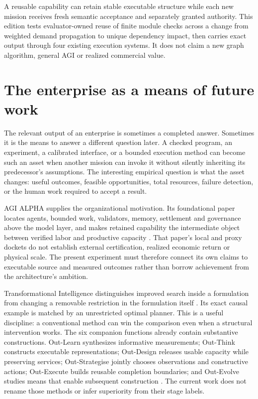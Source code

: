 \documentclass[11pt]{article}
\begin{document}

\begin{insightbox}[title={The central contribution}]
A reusable capability can retain stable executable structure while each new mission receives fresh semantic acceptance and separately granted authority. This edition tests evaluator-owned reuse of finite module checks across a change from weighted demand propagation to unique dependency impact, then carries exact output through four existing execution systems. It does not claim a new graph algorithm, general AGI or realized commercial value.
\end{insightbox}

\section{The enterprise as a means of future work}

The relevant output of an enterprise is sometimes a completed answer. Sometimes it is the means to answer a different question later. A checked program, an experiment, a calibrated interface, or a bounded execution method can become such an asset when another mission can invoke it without silently inheriting its predecessor's assumptions. The interesting empirical question is what the asset changes: useful outcomes, feasible opportunities, total resources, failure detection, or the human work required to accept a result.

AGI ALPHA supplies the organizational motivation. Its foundational paper locates agents, bounded work, validators, memory, settlement and governance above the model layer, and makes retained capability the intermediate object between verified labor and productive capacity \cite{agi_alpha}. That paper's local and proxy dockets do not establish external certification, realized economic return or physical scale. The present experiment must therefore connect its own claims to executable source and measured outcomes rather than borrow achievement from the architecture's ambition.

Transformational Intelligence distinguishes improved search inside a formulation from changing a removable restriction in the formulation itself \cite{ti}. Its exact causal example is matched by an unrestricted optimal planner. This is a useful discipline: a conventional method can win the comparison even when a structural intervention works. The six companion functions already contain substantive constructions. Out-Learn synthesizes informative measurements; Out-Think constructs executable representations; Out-Design releases usable capacity while preserving services; Out-Strategise jointly chooses observations and constructive actions; Out-Execute builds reusable completion boundaries; and Out-Evolve studies means that enable subsequent construction \cite{outlearn,outthink,outdesign,outstrategise,outexecute,outevolve}. The current work does not rename those methods or infer superiority from their stage labels.
\end{document}
